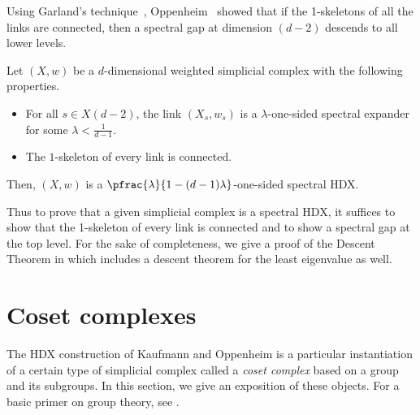 \documentclass{toc}
\begin{document}
Using Garland's technique~\cite{Garland1973}, Oppenheim~\cite{Oppenheim2018} 
showed that if the 1-skeletons of all the links are
connected, then a spectral gap at dimension $(d-2)$ descends to all
lower levels. 

%
\begin{dtheorem}[Oppenheim, 2018]\label{thm:trickle-down} %
%
%
%
Let $(X,w)$ be  %
a $d$-dimensional weighted simplicial complex with the following properties.
  \begin{itemize}
  \item For all $s \in X(d-2)$, the link $(X_s,w_s)$ is a
    $\lambda$-one-sided spectral expander for some $\lambda < \frac{1}{d-1}$. 
  \item The $1$-skeleton of every link is connected.
  \end{itemize}
  Then, $(X,w)$ is a $\pfrac{\lambda}{1 - (d-1)\lambda}$-one-sided spectral HDX.
\end{dtheorem}
Thus to prove that a given simplicial complex is a spectral HDX, it suffices to show that the 1-skeleton of %
every link is %
connected and %
to show   %
a spectral gap at the top level.
For the sake of completeness, we give a proof of the 
%
Descent Theorem  %
in
%
which includes a descent theorem for the least eigenvalue as well.

\section{Coset complexes}

The HDX construction of Kaufmann and Oppenheim is a particular instantiation of a certain type of simplicial complex called a \emph{coset complex} based on a group and its subgroups. In this section, we give an exposition of these objects. 
For a basic primer on group theory,
see .  %
%
\end{document}

